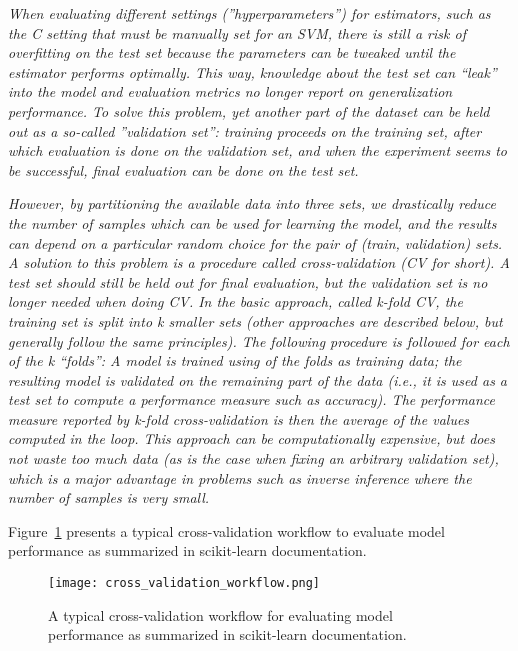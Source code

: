 \textit{When evaluating different settings (''hyperparameters'') for estimators, such as the C setting that must be manually set for an SVM, there is still a risk of overfitting on the test set because the parameters can be tweaked until the estimator performs optimally. This way, knowledge about the test set can “leak” into the model and evaluation metrics no longer report on generalization performance. To solve this problem, yet another part of the dataset can be held out as a so-called ''validation set'': training proceeds on the training set, after which evaluation is done on the validation set, and when the experiment seems to be successful, final evaluation can be done on the test set.}\cite{Scikit-learndevelopers2019a}

\textit{However, by partitioning the available data into three sets, we drastically reduce the number of samples which can be used for learning the model, and the results can depend on a particular random choice for the pair of (train, validation) sets.  A solution to this problem is a procedure called cross-validation (CV for short). A test set should still be held out for final evaluation, but the validation set is no longer needed when doing CV. In the basic approach, called k-fold CV, the training set is split into k smaller sets (other approaches are described below, but generally follow the same principles). The following procedure is followed for each of the k “folds”:  A model is trained using  of the folds as training data; the resulting model is validated on the remaining part of the data (i.e., it is used as a test set to compute a performance measure such as accuracy). The performance measure reported by k-fold cross-validation is then the average of the values computed in the loop. This approach can be computationally expensive, but does not waste too much data (as is the case when fixing an arbitrary validation set), which is a major advantage in problems such as inverse inference where the number of samples is very small.}\cite{Scikit-learndevelopers2019a}

Figure~\ref{fig:cross_validation_workflow} presents a typical cross-validation workflow to evaluate model performance as summarized in scikit-learn documentation\cite{Scikit-learndevelopers2019a}.

\begin{figure}[hbt!]
    \centering
    \texttt{[image: cross\_validation\_workflow.png]}
    \caption{A typical cross-validation workflow for evaluating model performance as summarized in scikit-learn documentation\cite{Scikit-learndevelopers2019a}.}
    \label{fig:cross_validation_workflow}
\end{figure}

